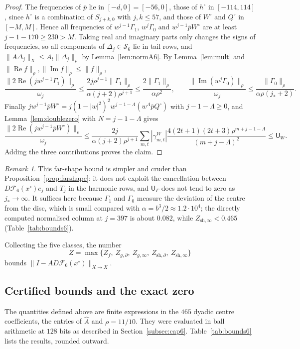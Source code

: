 \documentclass[11pt]{amsart}
\theoremstyle{definition}
\theoremstyle{remark}
\newtheorem{remark}[theorem]{Remark}
\numberwithin{equation}{section}
\newcommand{\Sc}{\mathcal{S}}
\newcommand{\Fc}{\mathcal{F}}
\newcommand{\jst}{j_*}
\newcommand{\sU}{\mathsf{U}}
\DeclareMathOperator{\re}{Re}
\DeclareMathOperator{\im}{Im}
\newcommand{\nrm}[1]{\lVert #1\rVert}
\begin{document}
\begin{proof}
The frequencies of $\overline p$ lie in $[-d,0]=[-56,0]$, those of $h^\circ$ in $[-114,114]$, since $h^\circ$ is a combination of $S_{j+k,0}$ with $j,k\leq57$, and those of $W^\circ$ and $Q^\circ$ in $[-M,M]$. Hence all frequencies of $w^{j-1}\Gamma_1$, $w^j\Gamma_0$ and $w^{j-1}\overline pW^\circ$ are at least $j-1-170\geq230>M$. Taking real and imaginary parts only changes the signs of frequencies, so all components of $\Delta_j\in\Sc_6$ lie in tail rows, and $\nrm{A\Delta_j}_X\leq A_t\nrm{\Delta_j}_\rho$ by Lemma~\ref{lem:normA6}. By Lemma~\ref{lem:mult} and $\nrm{\re f}_\rho,\nrm{\im f}_\rho\leq\nrm f_\rho$,
\[
\frac{\nrm{2\re(jw^{j-1}\Gamma_1)}_\rho}{\omega_j}\leq\frac{2j\rho^{j-1}\nrm{\Gamma_1}_\rho}{\alpha(j+2)\rho^{j+1}}\leq\frac{2\nrm{\Gamma_1}_\rho}{\alpha\rho^2},\qquad\frac{\nrm{\im(w^j\Gamma_0)}_\rho}{\omega_j}\leq\frac{\nrm{\Gamma_0}_\rho}{\alpha\rho(\jst+2)} .
\]
Finally $jw^{j-1}\overline pW^\circ=j(1-|w|^2)^2w^{j-1-\Lambda}(w^\Lambda\overline pQ^\circ)$ with $j-1-\Lambda\geq0$, and Lemma~\ref{lem:doublezero} with $N=j-1-\Lambda$ gives
\[
\frac{\nrm{2\re(jw^{j-1}\overline pW^\circ)}_\rho}{\omega_j}\leq\frac{2j}{\alpha(j+2)\rho^{j+1}}\sum_{m,t}|\gamma^W_{m,t}|\frac{4(2t+1)(2t+3)\rho^{m+j-1-\Lambda}}{(m+j-\Lambda)^2}\leq\sU_W .
\]
Adding the three contributions proves the claim.
\end{proof}

\begin{remark}
This far-shape bound is simpler and cruder than Proposition~\ref{prop:farshape}: it does not exploit the cancellation between $D\Fc_6(x^\circ)e_j$ and $T_j$ in the harmonic rows, and $\sU_\Gamma$ does not tend to zero as $\jst\to\infty$. It suffices here because $\Gamma_1$ and $\Gamma_0$ measure the deviation of the centre from the disc, which is small compared with $\alpha=b^3/2\approx1.2\cdot10^4$; the directly computed normalised column at $j=397$ is about $0.082$, while $Z_{\mathrm{sh},\infty}<0.465$ (Table~\ref{tab:bounds6}).
\end{remark}

Collecting the five classes, the number
\[
Z=\max\{Z_f,\ Z_{g,\partial},\ Z_{g,\infty},\ Z_{\mathrm{sh},\partial},\ Z_{\mathrm{sh},\infty}\}
\]
bounds $\nrm{I-AD\Fc_6(x^\circ)}_{X\to X}$.

\subsection{Certified bounds and the exact zero}
The quantities defined above are finite expressions in the $465$ dyadic centre coefficients, the entries of $\widehat A$ and $\rho=11/10$. They were evaluated in ball arithmetic at $128$ bits as described in Section~\ref{subsec:cap6}. Table~\ref{tab:bounds6} lists the results, rounded outward.
\end{document}
